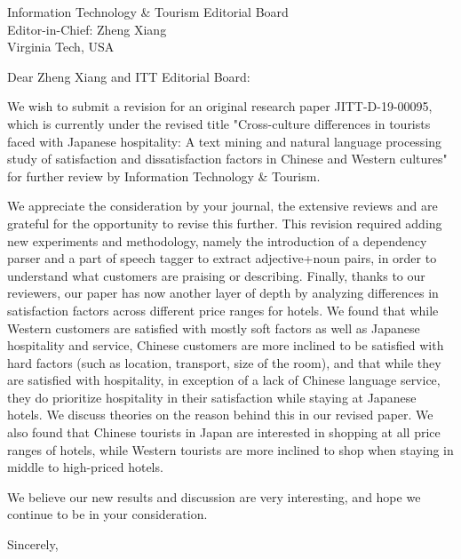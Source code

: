 \documentclass{letter}
\begin{document}
\begin{letter}{
Information Technology \& Tourism Editorial Board \\
Editor-in-Chief:  Zheng Xiang\\
Virginia Tech, USA}

\opening{Dear Zheng Xiang and ITT Editorial Board:}

We wish to submit a revision for an original research paper JITT-D-19-00095, which is currently under the revised title "Cross-culture differences in tourists faced with Japanese hospitality: A text mining and natural language processing study of satisfaction and dissatisfaction factors in Chinese and Western cultures" for further review by Information Technology \& Tourism.

We appreciate the consideration by your journal, the extensive reviews and are grateful for the opportunity to revise this further. This revision required adding new experiments and methodology, namely the introduction of a dependency parser and a part of speech tagger to extract adjective+noun pairs, in order to understand what customers are praising or describing. Finally, thanks to our reviewers, our paper has now another layer of depth by analyzing differences in satisfaction factors across different price ranges for hotels. We found that while Western customers are satisfied with mostly soft factors as well as Japanese hospitality and service, Chinese customers are more inclined to be satisfied with hard factors (such as location, transport, size of the room), and that while they are satisfied with hospitality, in exception of a lack of Chinese language service, they do prioritize hospitality in their satisfaction while staying at Japanese hotels. We discuss theories on the reason behind this in our revised paper. We also found that Chinese tourists in Japan are interested in shopping at all price ranges of hotels, while Western tourists are more inclined to shop when staying in middle to high-priced hotels. 

We believe our new results and discussion are very interesting, and hope we continue to be in your consideration.

\closing{Sincerely,}


\end{letter}
\end{document}
